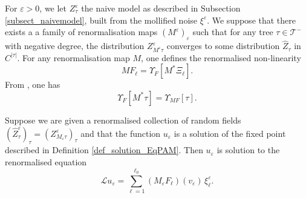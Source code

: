 \documentclass[11pt]{preprint}
\newcommand{\mcT}{\mathcal{T}}
\def\eps{\varepsilon}
\let\eps\varepsilon
\newcommand{\scrL}{\mathscr{L}}
\begin{document}
	
	For $\eps>0$, we let $Z^\eps_\tau$ the naive model as described in Subsection \ref{subsect_naivemodel}, built from the mollified noise $\xi^\eps$. We suppose that there exists a a family of renormalisation maps $(M^\eps)_\eps$ such that for any tree $\tau\in\mcT^-$ with negative degree, the distribution $Z^\eps_{M^\eps \tau}$ converges to some distribution $\widehat{Z}_\tau$ in $C^{|\tau|}$. For any renormalisation map $M$, one defines the renormalised non-linearity 
	\begin{equation}
		MF_\ell = \Upsilon_F[M^*\Xi_\ell ].
	\end{equation}
	From \cite[Lemma 3.23]{BCCH}, one has
	\begin{equation}\label{eq_renormalisedElementaryDiff}
		\Upsilon_F[M^*\tau] = \Upsilon_{MF}[\tau].
	\end{equation}
	
	
	\begin{proposition}\label{prop_eqrenormalised_0}
		Suppose we are given a renormalised collection of random fields $(\widehat Z_\tau^\eps)_\tau = (Z^\eps_{M_\eps\tau})_\tau$ and that the function $u_\eps$ is a solution of the fixed point described in Definition \ref{def_solution_EqPAM}. Then $u_\eps$ is solution to the renormalised equation
		$$
		\scrL u_\eps =\sum_{\ell=1}^{\ell_0} (M_\eps F_\ell)(v_{\eps})\, \xi_\ell^\eps  .
		$$
	\end{proposition}
	
\end{document}
